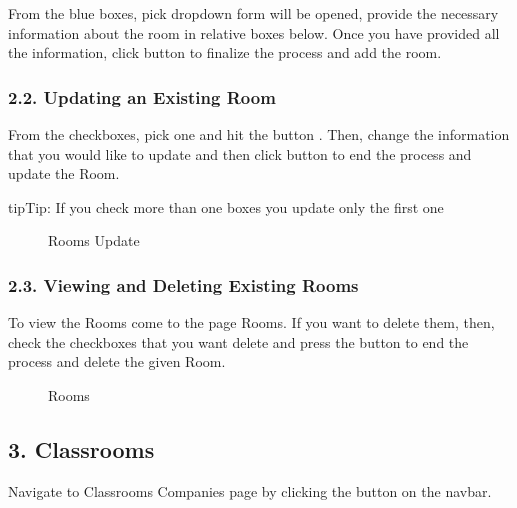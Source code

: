 \documentclass[letterpaper,10pt,english]{sphinxmanual}
\begin{document}
From the blue boxes, pick  dropdown form will be opened, provide the necessary information
about the room in relative boxes below. Once you have provided all the information, click 
button to finalize the process and add the room.


\subsubsection{2.2. Updating an Existing Room}
\label{\detokenize{user/berkay:updating-an-existing-room}}
From the checkboxes, pick one and hit the button . Then, change the information that
you would like to update and then click  button to end the process and update the Room.

\begin{sphinxadmonition}{tip}{Tip:}
If you check more than one boxes you update only the first one
\end{sphinxadmonition}

\begin{figure}[htbp]
\centering
\capstart

\noindent{}
\caption{Rooms Update}\label{\detokenize{user/berkay:id6}}\end{figure}


\subsubsection{2.3. Viewing and Deleting Existing Rooms}
\label{\detokenize{user/berkay:viewing-and-deleting-existing-rooms}}
To view the Rooms come to the page Rooms. If you want to delete them,
then, check the checkboxes that you want delete and press the  button to
end the process and delete the given Room.

\begin{figure}[htbp]
\centering
\capstart

\noindent{}
\caption{Rooms}\label{\detokenize{user/berkay:id7}}\end{figure}


\subsection{3. Classrooms}
\label{\detokenize{user/berkay:classrooms}}
Navigate to Classrooms Companies page by clicking the  button on the navbar.
\end{document}
